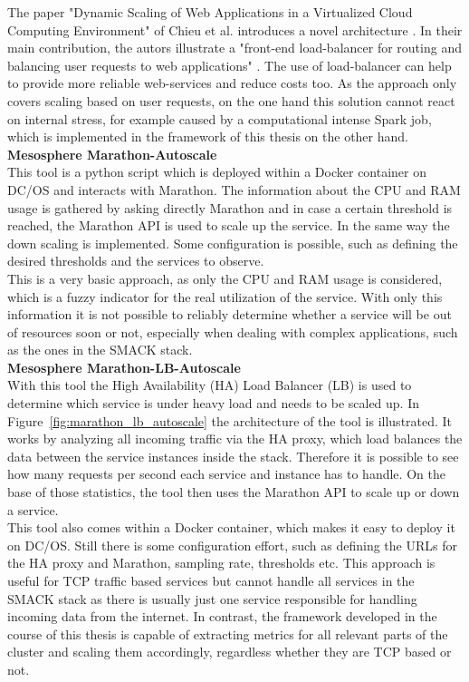 The paper "Dynamic Scaling of Web Applications in a Virtualized Cloud Computing Environment" of Chieu et al. introduces a novel architecture \cite{chieu2009dynamic}.
In their main contribution, the autors illustrate a "front-end load-balancer for routing and balancing user requests to web applications" \cite{chieu2009dynamic}.
The use of load-balancer can help to provide more reliable web-services and reduce costs too.
As the approach only covers scaling based on user requests, on the one hand this solution cannot react on internal stress, for example caused by a computational intense Spark job, which is implemented in the framework of this thesis on the other hand.\\

\textbf{Mesosphere Marathon-Autoscale} \cite{marathon_autoscale}\\
This tool is a python script which is deployed within a Docker container on DC/OS and interacts with Marathon.
The information about the CPU and RAM usage is gathered by asking directly Marathon and in case a certain threshold is reached, the Marathon API is used to scale up the service.
In the same way the down scaling is implemented.
Some configuration is possible, such as defining the desired thresholds and the services to observe.\\
This is a very basic approach, as only the CPU and RAM usage is considered, which is a fuzzy indicator for the real utilization of the service.
With only this information it is not possible to reliably determine whether a service will be out of resources soon or not, especially when dealing with complex applications, such as the ones in the SMACK stack.\\

\textbf{Mesosphere Marathon-LB-Autoscale} \cite {marathon_lb_autoscale}\\
With this tool the High Availability (HA) Load Balancer (LB) is used to determine which service is under heavy load and needs to be scaled up.
In Figure~\ref{fig:marathon_lb_autoscale} the architecture of the tool is illustrated.
It works by analyzing all incoming traffic via the HA proxy, which load balances the data between the service instances inside the stack.
Therefore it is possible to see how many requests per second each service and instance has to handle.
On the base of those statistics, the tool then uses the Marathon API to scale up or down a service.\\
This tool also comes within a Docker container, which makes it easy to deploy it on DC/OS.
Still there is some configuration effort, such as defining the URLs for the HA proxy and Marathon, sampling rate, thresholds etc.
This approach is useful for TCP traffic based services but cannot handle all services in the SMACK stack as there is usually just one service responsible for handling incoming data from the internet.
In contrast, the framework developed in the course of this thesis is capable of extracting metrics for all relevant parts of the cluster and scaling them accordingly, regardless whether they are TCP based or not.

